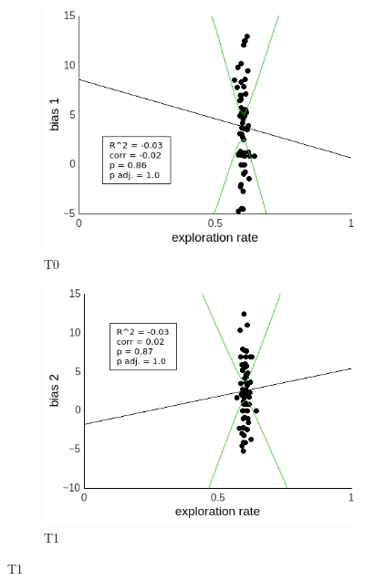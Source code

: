 \documentclass[a4paper]{scrreprt}
\begin{document}
\begin{figure}
\centering
\begin{subfigure}[b]{0.49\textwidth}
        \includegraphics[width=\textwidth]{figs/sec3/temp/tempno_diff_1_mod2mod2.jpeg}
        \caption{T0}
    \end{subfigure}
    \begin{subfigure}[b]{0.49\textwidth}
        \includegraphics[width=\textwidth]{figs/sec3/temp/tempno_diff_2_mod2mod2.jpeg}
        \caption{T1}
    \end{subfigure}


\end{figure}
\end{document}
